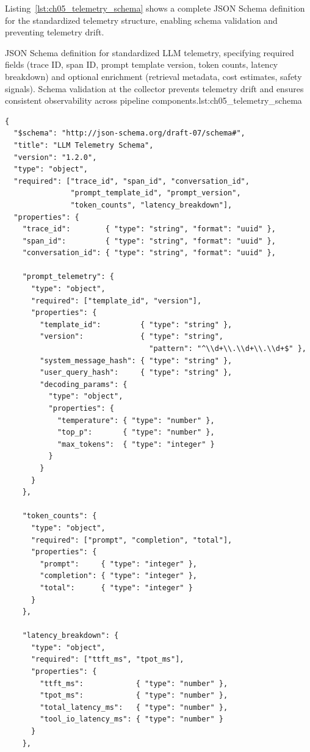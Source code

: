 Listing~\ref{lst:ch05_telemetry_schema} shows a complete JSON Schema definition for the standardized telemetry structure, enabling schema validation and preventing telemetry drift.

\begin{codebox}{JSON Schema definition for standardized LLM telemetry, specifying required fields (trace ID, span ID, prompt template version, token counts, latency breakdown) and optional enrichment (retrieval metadata, cost estimates, safety signals). Schema validation at the collector prevents telemetry drift and ensures consistent observability across pipeline components.}{lst:ch05_telemetry_schema}
\begin{verbatim}
{
  "$schema": "http://json-schema.org/draft-07/schema#",
  "title": "LLM Telemetry Schema",
  "version": "1.2.0",
  "type": "object",
  "required": ["trace_id", "span_id", "conversation_id",
               "prompt_template_id", "prompt_version",
               "token_counts", "latency_breakdown"],
  "properties": {
    "trace_id":        { "type": "string", "format": "uuid" },
    "span_id":         { "type": "string", "format": "uuid" },
    "conversation_id": { "type": "string", "format": "uuid" },

    "prompt_telemetry": {
      "type": "object",
      "required": ["template_id", "version"],
      "properties": {
        "template_id":         { "type": "string" },
        "version":             { "type": "string",
                                 "pattern": "^\\d+\\.\\d+\\.\\d+$" },
        "system_message_hash": { "type": "string" },
        "user_query_hash":     { "type": "string" },
        "decoding_params": {
          "type": "object",
          "properties": {
            "temperature": { "type": "number" },
            "top_p":       { "type": "number" },
            "max_tokens":  { "type": "integer" }
          }
        }
      }
    },

    "token_counts": {
      "type": "object",
      "required": ["prompt", "completion", "total"],
      "properties": {
        "prompt":     { "type": "integer" },
        "completion": { "type": "integer" },
        "total":      { "type": "integer" }
      }
    },

    "latency_breakdown": {
      "type": "object",
      "required": ["ttft_ms", "tpot_ms"],
      "properties": {
        "ttft_ms":            { "type": "number" },
        "tpot_ms":            { "type": "number" },
        "total_latency_ms":   { "type": "number" },
        "tool_io_latency_ms": { "type": "number" }
      }
    },


\end{verbatim}
\end{codebox}
